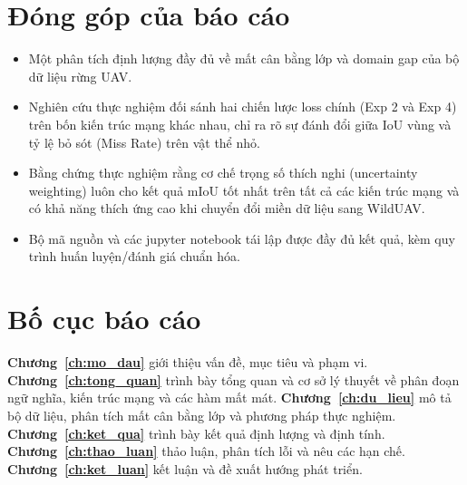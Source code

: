 \section{Đóng góp của báo cáo}

\begin{itemize}[leftmargin=1.4cm]
  \item Một phân tích định lượng đầy đủ về mất cân bằng lớp và domain gap của bộ dữ
  liệu rừng UAV.
  \item Nghiên cứu thực nghiệm đối sánh hai chiến lược loss chính (Exp 2 và Exp 4) trên bốn kiến trúc mạng khác nhau, chỉ ra rõ sự đánh đổi giữa IoU vùng và tỷ lệ bỏ sót (Miss Rate) trên vật thể nhỏ.
  \item Bằng chứng thực nghiệm rằng cơ chế trọng số thích nghi (uncertainty weighting) luôn cho kết quả mIoU tốt nhất trên tất cả các kiến trúc mạng và có khả năng thích ứng cao khi chuyển đổi miền dữ liệu sang WildUAV.
  \item Bộ mã nguồn và các jupyter notebook tái lập được đầy đủ kết quả, kèm quy trình huấn luyện/đánh giá chuẩn hóa.
\end{itemize}

\section{Bố cục báo cáo}

\textbf{Chương~\ref{ch:mo_dau}} giới thiệu vấn đề, mục tiêu và phạm vi.
\textbf{Chương~\ref{ch:tong_quan}} trình bày tổng quan và cơ sở lý thuyết về phân
đoạn ngữ nghĩa, kiến trúc mạng và các hàm mất mát.
\textbf{Chương~\ref{ch:du_lieu}} mô tả bộ dữ liệu, phân tích mất cân bằng lớp và
phương pháp thực nghiệm.
\textbf{Chương~\ref{ch:ket_qua}} trình bày kết quả định lượng và định tính.
\textbf{Chương~\ref{ch:thao_luan}} thảo luận, phân tích lỗi và nêu các hạn chế.
\textbf{Chương~\ref{ch:ket_luan}} kết luận và đề xuất hướng phát triển.

